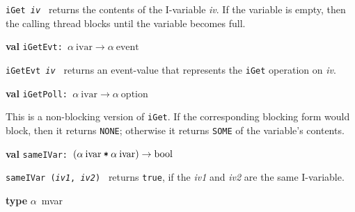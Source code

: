 \begin{descr}
\begin{speccomment}
\item {\tt i\-Get \textit{iv}           } 
returns the contents of the I-variable \textit{iv}.\- 	  If the variable is empty, then the calling thread blocks until 	  the variable becomes full.\-     \end{speccomment}
\item {}{\textbf{val}} {\tt iGetEvt: \(\alpha\:\mathrm{ivar}\rightarrow \alpha\:\mathrm{event}\)}\label{val-SYNC_VAR.iGetEvt}


\begin{speccomment}
\item {\tt i\-Get\-Evt \textit{iv}           } 
returns an event-value that represents the \texttt{i\-Get} 	  operation on \textit{iv}.\-     \end{speccomment}
\item {}{\textbf{val}} {\tt iGetPoll: \(\alpha\:\mathrm{ivar}\rightarrow \alpha\:\mathrm{option}\)}\label{val-SYNC_VAR.iGetPoll}


\begin{speccomment}
\item 

	  This is a non-blocking version of \texttt{i\-Get}.\- 	  If the corresponding blocking form would block, then it returns 	  \texttt{NONE}; otherwise 	  it returns \texttt{SOME} 	  of the variable's contents.\-     \end{speccomment}
\item {}{\textbf{val}} {\tt sameIVar: \((\alpha\:\mathrm{ivar}\:\verb,*,\:\alpha\:\mathrm{ivar})\rightarrow \mathrm{bool}\)}\label{val-SYNC_VAR.sameIVar}


\begin{speccomment}
\item {\tt same\-IVar (\textit{iv1}, \textit{iv2})           } 
returns {\tt true}, if the \textit{iv1} and \textit{iv2} are the 	  same I-variable.\-     \end{speccomment}
\item {}{\textbf{type}} \(\alpha\)~mvar\label{ty-SYNC_VAR.mvar}

\begin{speccomment}
\item 


\end{speccomment}
\end{descr}
